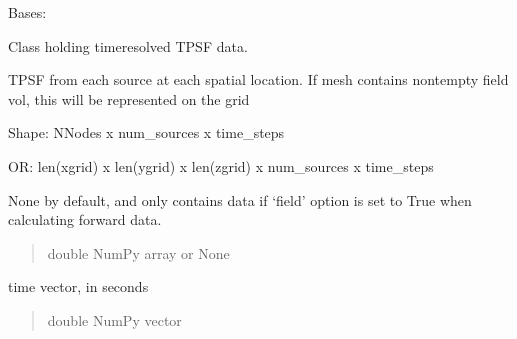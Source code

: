 \documentclass[letterpaper,10pt,english]{sphinxmanual}
\begin{document}
\begin{fulllineitems}
\label{\detokenize{_autosummary/nirfasterff.base.data.TPSFdata:nirfasterff.base.data.TPSFdata}}
\pysigstartsignatures
{}
\pysigstopsignatures
\sphinxAtStartPar
Bases: 

\sphinxAtStartPar
Class holding time\sphinxhyphen{}resolved TPSF data.

\begin{fulllineitems}
\label{\detokenize{_autosummary/nirfasterff.base.data.TPSFdata:nirfasterff.base.data.TPSFdata.phi}}
\pysigstartsignatures
{}
\pysigstopsignatures
\sphinxAtStartPar
TPSF from each source at each spatial location. If mesh contains non\sphinxhyphen{}tempty field vol, this will be represented on the grid

\sphinxAtStartPar
Shape: NNodes x num\_sources x time\_steps

\sphinxAtStartPar
OR: len(xgrid) x len(ygrid) x len(zgrid) x num\_sources x time\_steps

\sphinxAtStartPar
None by default, and only contains data if ‘field’ option is set to True when calculating forward data.
\begin{quote}\begin{description}
\sphinxAtStartPar
double NumPy array or None

\end{description}\end{quote}

\end{fulllineitems}


\begin{fulllineitems}
\label{\detokenize{_autosummary/nirfasterff.base.data.TPSFdata:nirfasterff.base.data.TPSFdata.time}}
\pysigstartsignatures
{}
\pysigstopsignatures
\sphinxAtStartPar
time vector, in seconds
\begin{quote}\begin{description}
\sphinxAtStartPar
double NumPy vector


\end{description}
\end{quote}
\end{fulllineitems}
\end{fulllineitems}
\end{document}
